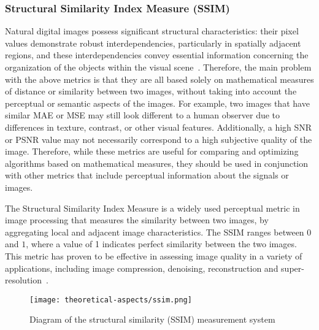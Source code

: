 \subsubsection*{Structural Similarity Index Measure (SSIM)}
Natural digital images possess significant structural characteristics: their pixel values demonstrate robust interdependencies, particularly in spatially adjacent regions, and these interdependencies convey essential information concerning the organization of the objects within the visual scene~\supercite{ssim}. Therefore, the main problem with the above metrics is that they are all based solely on mathematical measures of distance or similarity between two images, without taking into account the perceptual or semantic aspects of the images. For example, two images that have similar MAE or MSE may still look different to a human observer due to differences in texture, contrast, or other visual features. Additionally, a high SNR or PSNR value may not necessarily correspond to a high subjective quality of the image. Therefore, while these metrics are useful for comparing and optimizing algorithms based on mathematical measures, they should be used in conjunction with other metrics that include perceptual information about the signals or images.

The Structural Similarity Index Measure is a widely used perceptual metric in image processing that measures the similarity between two images, by aggregating local and adjacent image characteristics. The SSIM ranges between $0$ and $1$, where a value of 1 indicates perfect similarity between the two images. This metric has proven to be effective in assessing image quality in a variety of applications, including image compression, denoising, reconstruction and super-resolution~\supercite{ssim,ssim-use2,ssim-use3}.
\begin{figure}[ht]
    \centering
    \texttt{[image: theoretical-aspects/ssim.png]}
    \caption[Diagram of the structural similarity (SSIM) measurement system]{Diagram of the structural similarity (SSIM) measurement system~\supercite{ssim}}
    \label{fig:ssim}
\end{figure}

